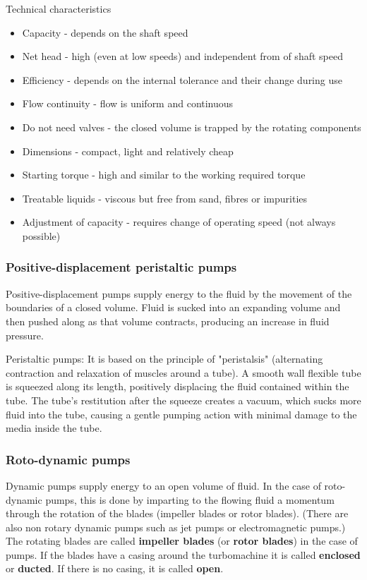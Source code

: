 \documentclass[class=report, crop=false, 12pt,a4paper]{standalone}
\begin{document}
Technical characteristics
\begin{itemize}
  \item Capacity - depends on the shaft speed
  \item Net head - high (even at low speeds) and independent from of shaft speed
  \item Efficiency - depends on the internal tolerance and their change during use
  \item Flow continuity - flow is uniform and continuous
  \item Do not need valves - the closed volume is trapped by the rotating components
  \item Dimensions - compact, light and relatively cheap
  \item Starting torque - high and similar to the working required torque
  \item Treatable liquids - viscous but free from sand, fibres or impurities
  \item Adjustment of capacity - requires change of operating speed (not always possible)
\end{itemize}
\subsubsection*{Positive-displacement peristaltic pumps}
Positive-displacement pumps supply energy to the fluid by the movement of the boundaries of a closed volume. Fluid is sucked into an expanding volume and then pushed along as that volume contracts, producing an increase in fluid pressure.

Peristaltic pumps: It is based on the principle of "peristalsis" (alternating contraction and relaxation of muscles around a tube). A smooth wall flexible tube is squeezed along its length, positively displacing the fluid contained within the tube. The tube's restitution after the squeeze creates a vacuum, which sucks more fluid into the tube, causing a gentle pumping action with minimal damage to the media inside the tube.
\subsubsection*{Roto-dynamic pumps}
Dynamic pumps supply energy to an open volume of fluid. In the case of roto-dynamic pumps, this is done by imparting to the flowing fluid a momentum through the rotation of the blades (impeller blades or rotor blades). (There are also non rotary dynamic pumps such as jet pumps or electromagnetic pumps.) The rotating blades are called \textbf{impeller blades} (or \textbf{rotor blades}) in the case of pumps. If the blades have a casing around the turbomachine it is called \textbf{enclosed} or \textbf{ducted}. If there is no casing, it is called \textbf{open}. 
\end{document}
